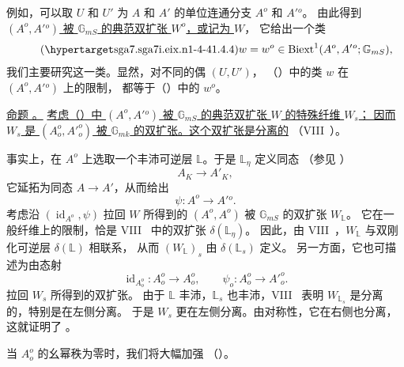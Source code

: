例如，可以取 $U$ 和 $U'$ 为 $A$ 和 $A'$ 的单位连通分支 $A^o$ 和 $A'{}^o$。
由此得到 \underline{$(A^o,A'{}^o)$ 被 $\mathbb G_{mS}$ 的典范双扩张 $W^o$，或记为 $W$}，
它给出一个类
\begin{equation}\tag{\SGARefTarget{sga7.sga7i.eix.n1-4-4}{1.4.4}}
 w=w^o\in\mathrm{Biext}^1(A^o,A'{}^o;\mathbb G_{mS}),
\end{equation}
我们主要研究这一类。显然，对不同的偶 $(U,U')$，
（）中的类 $w$ 在 $(A^o,A'{}^o)$ 上的限制，
都等于（）中的 $w^o$。

\medskip
\noindent
\underline{命题 。}
\underline{考虑（）中 $(A^o,A'{}^o)$ 被 $\mathbb G_{mS}$ 的典范双扩张 $W$ 的特殊纤维 $W_s$；
因而 $W_s$ 是 $(A_o^o,{A'}_o^o)$ 被 $\mathbb G_{mk}$ 的双扩张。这个双扩张是分离的}
（VIII~）。

事实上，在 $A^o$ 上选取一个丰沛可逆层 $\mathbb L$。于是 $\mathbb L_\eta$ 定义同态
（参见 ）
\[
 A_K\longrightarrow A'_K,
\]
它延拓为同态 $A\longrightarrow A'$，从而给出
\[
 \psi:A^o\longrightarrow A'{}^o.
\]
考虑沿 $(\operatorname{id}_{A^o},\psi)$ 拉回 $W$ 所得到的
$(A^o,A^o)$ 被 $\mathbb G_{mS}$ 的双扩张 $W_{\mathbb L}$。
它在一般纤维上的限制，恰是 VIII~ 中的双扩张 $\delta(\mathbb L_\eta)$。
因此，由 VIII~，$W_{\mathbb L}$ 与双刚化可逆层 $\delta(\mathbb L)$ 相联系，
从而 $(W_{\mathbb L})_s$ 由 $\delta(\mathbb L_s)$ 定义。
另一方面，它也可描述为由态射
\[
 \operatorname{id}_{A_o^o}:A_o^o\longrightarrow A_o^o,
 \qquad
 \psi_o:A_o^o\longrightarrow {A'}_o^o.
\]
拉回 $W_s$ 所得到的双扩张。
由于 $\mathbb L$ 丰沛，$\mathbb L_s$ 也丰沛，VIII~ 表明
$W_{\mathbb L_s}$ 是分离的，特别是在左侧分离。
于是 $W_s$ 更在左侧分离。由对称性，它在右侧也分离，这就证明了 。

当 $A_o^o$ 的幺幂秩为零时，我们将大幅加强 
（）。



